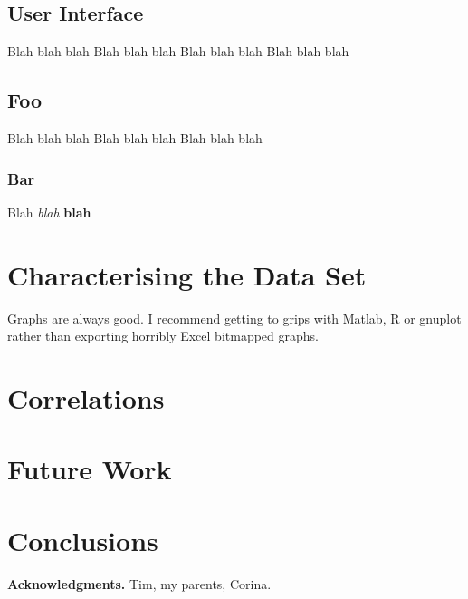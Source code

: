 \documentclass{mpaper}
\begin{document}
\subsection{User Interface}

Blah blah blah
Blah blah blah
Blah blah blah
Blah blah blah

\subsection{Foo}

Blah blah blah
Blah blah blah
Blah blah blah

\subsubsection{Bar}
\textsf{Blah} \textit{blah} \textbf{blah}

\section{Characterising the Data Set}

Graphs are always good. I recommend getting to grips with Matlab, R or
gnuplot rather than exporting horribly Excel bitmapped graphs.

\section{Correlations}

\section{Future Work}

\section{Conclusions}

\vskip8pt \noindent
{\bf Acknowledgments.}
Tim, my parents, Corina.



\end{document}
